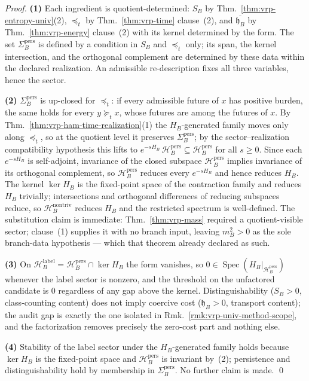 \documentclass[12pt,oneside]{amsbook}
\theoremstyle{plain}
\theoremstyle{definition}
\theoremstyle{remark}
\begin{document}
\begin{proof}
\textbf{(1)}  Each ingredient is quotient-determined:
$S_B$ by Thm.~\ref{thm:vrp-entropy-univ}(2), $\preceq_t$ by
Thm.~\ref{thm:vrp-time} clause~(2), and
$\overline{\mathfrak{h}_B}$ by Thm.~\ref{thm:vrp-energy} clause~(2)
with its kernel determined by the form.  The set
$\Sigma_B^{\mathrm{pers}}$ is defined by a condition in $S_B$ and
$\preceq_t$ only; its span, the kernel intersection, and the
orthogonal complement are determined by these data within the
declared realization.  An admissible re-description fixes all
three variables, hence the sector.

\textbf{(2)}  $\Sigma_B^{\mathrm{pers}}$ is up-closed for
$\preceq_t$: if every admissible future of $x$ has positive
burden, the same holds for every $y \succeq_t x$, whose futures
are among the futures of $x$.  By
Thm.~\ref{thm:vrp-ham-time-realization}(1) the $H_B$-generated
family moves only along $\preceq_t$, so at the quotient level it
preserves $\Sigma_B^{\mathrm{pers}}$; by the sector--realization
compatibility hypothesis this lifts to
$e^{-sH_B}\,\mathcal{H}_B^{\mathrm{pers}} \subseteq
\mathcal{H}_B^{\mathrm{pers}}$ for all $s \ge 0$.  Since each
$e^{-sH_B}$ is self-adjoint, invariance of the closed subspace
$\mathcal{H}_B^{\mathrm{pers}}$ implies invariance of its
orthogonal complement, so $\mathcal{H}_B^{\mathrm{pers}}$ reduces
every $e^{-sH_B}$ and hence reduces $H_B$.  The kernel
$\ker H_B$ is the fixed-point space of the contraction family and
reduces $H_B$ trivially; intersections and orthogonal differences
of reducing subspaces reduce, so
$\mathcal{H}_B^{\mathrm{nontriv}}$ reduces $H_B$ and the
restricted spectrum is well-defined.  The substitution claim is
immediate: Thm.~\ref{thm:vrp-mass} required a quotient-visible
sector; clause~(1) supplies it with no branch input, leaving
$m_B^2 > 0$ as the sole branch-data hypothesis --- which that
theorem already declared as such.

\textbf{(3)}  On $\mathcal{H}_B^{\mathrm{label}} =
\mathcal{H}_B^{\mathrm{pers}} \cap \ker H_B$ the form vanishes,
so $0 \in \operatorname{Spec}(H_B|_{\mathcal{H}_B^{\mathrm{pers}}})$
whenever the label sector is nonzero, and the threshold on the
unfactored candidate is $0$ regardless of any gap above the
kernel.  Distinguishability ($S_B > 0$, class-counting content)
does not imply coercive cost ($\mathfrak{h}_B > 0$, transport
content); the audit gap is exactly the one isolated in
Rmk.~\ref{rmk:vrp-univ-method-scope}, and the factorization
removes precisely the zero-cost part and nothing else.

\textbf{(4)}  Stability of the label sector under the
$H_B$-generated family holds because $\ker H_B$ is the fixed-point
space and $\mathcal{H}_B^{\mathrm{pers}}$ is invariant by~(2);
persistence and distinguishability hold by membership in
$\Sigma_B^{\mathrm{pers}}$.  No further claim is made. \qed
\end{proof}
\end{document}
